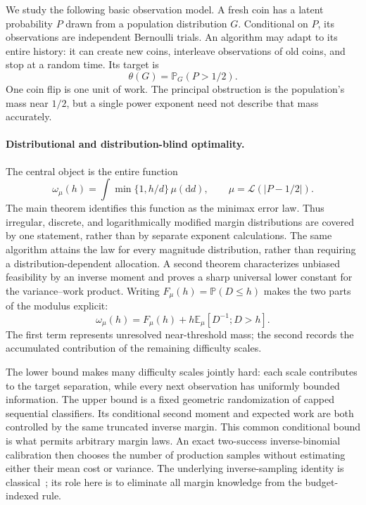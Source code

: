 \documentclass[11pt,a4paper]{article}
\theoremstyle{definition}
\newcommand{\E}{\mathbb E}
\newcommand{\Prob}{\mathbb P}
\begin{document}
We study the following basic observation model. A fresh coin has a latent
probability $P$ drawn from a population distribution $G$. Conditional on $P$,
its observations are independent Bernoulli trials. An algorithm may adapt to
its entire history: it can create new coins, interleave observations of old
coins, and stop at a random time. Its target is
\begin{equation}\label{eq:target}
 \theta(G)=\Prob_G(P>1/2).
\end{equation}
One coin flip is one unit of work. The principal obstruction is the
population's mass near $1/2$, but a single power exponent need not describe
that mass accurately.

\paragraph{Distributional and distribution-blind optimality.}
The central object is the entire function
\begin{equation}\label{eq:modulus-intro}
 \omega_\mu(h)=\int\min\{1,h/d\}\,\mu(\mathrm d d),
 \qquad \mu=\mathcal L(|P-1/2|).
\end{equation}
The main theorem identifies this function as the minimax error law. Thus
irregular, discrete, and logarithmically modified margin distributions are
covered by one statement, rather than by separate exponent calculations.
The same algorithm attains the law for every magnitude distribution, rather
than requiring a distribution-dependent allocation. A second theorem
characterizes unbiased feasibility by an inverse moment and proves a sharp
universal lower constant for the variance--work product.
Writing $F_\mu(h)=\Prob(D\le h)$ makes the two parts of the modulus explicit:
\[
 \omega_\mu(h)=F_\mu(h)+h\E_\mu[D^{-1};D>h].
\]
The first term represents unresolved near-threshold mass; the second records
the accumulated contribution of the remaining difficulty scales.

The lower bound makes many difficulty scales jointly hard: each scale
contributes to the target separation, while every next observation has
uniformly bounded information. The upper bound is a fixed geometric
randomization of capped sequential classifiers. Its conditional second
moment and expected work are both controlled by the same truncated inverse
margin. This common conditional bound is what permits arbitrary margin laws.
An exact two-success inverse-binomial calibration then chooses the number
of production samples without estimating either their mean cost or variance.
The underlying inverse-sampling identity is classical~\cite{haldane}; its
role here is to eliminate all margin knowledge from the budget-indexed rule.
\end{document}

